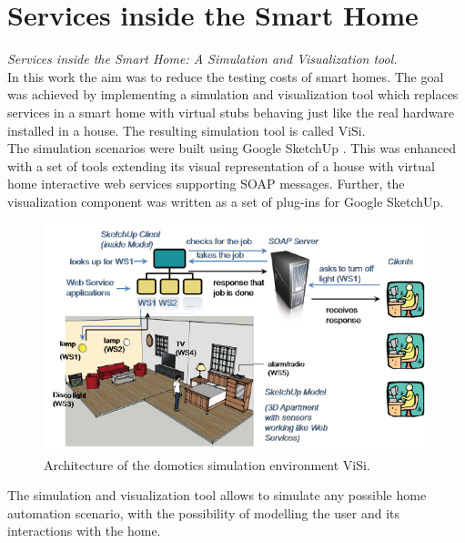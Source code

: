 \section{Services inside the Smart Home}\label{sec:services_in_smart_homes}
\emph{Services inside the Smart Home: A Simulation and Visualization tool.}\\

In this work \cite{lazovik2009services} the aim was to reduce the testing costs of smart homes. The goal was achieved by implementing a simulation and visualization tool which replaces services in a smart home with virtual stubs behaving just like the real hardware installed in a house. The resulting simulation tool is called ViSi.\\

The simulation scenarios were built using Google SketchUp \cite{sketchup:online}. This was enhanced with a set of tools extending its visual representation of a house with virtual home interactive web services supporting SOAP messages. Further, the visualization component was written as a set of plug-ins for Google SketchUp.\\

\begin{figure}[H]
	\centering
	\includegraphics[width=\linewidth]{gfx/Chapter2/services_in_smarthomes}
	\caption{Architecture of the domotics simulation environment ViSi.}
	\label{fig:diasim_architecture}
\end{figure}

The simulation and visualization tool allows to simulate any possible home automation scenario, with the possibility of modelling the user and its interactions with the home.
